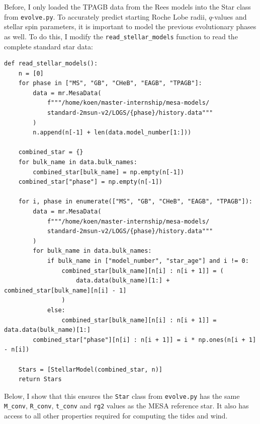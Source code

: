 \documentclass[a4paper,10pt]{article}
\begin{document}
Before, I only loaded the TPAGB data from the Rees models into the Star class from \lstinline[style=output, breaklines=true]|evolve.py|. To accurately predict starting Roche Lobe radii, \(q\)-values and stellar spin parameters, it is important to model the previous evolutionary phases as well. To do this, I modify the \lstinline[style=output, breaklines=true]|read_stellar_models| function to read the complete standard star data:
\begin{verbatim}
def read_stellar_models():
    n = [0]
    for phase in ["MS", "GB", "CHeB", "EAGB", "TPAGB"]:
        data = mr.MesaData(
            f"""/home/koen/master-internship/mesa-models/
            standard-2msun-v2/LOGS/{phase}/history.data"""
        )
        n.append(n[-1] + len(data.model_number[1:]))

    combined_star = {}
    for bulk_name in data.bulk_names:
        combined_star[bulk_name] = np.empty(n[-1])
    combined_star["phase"] = np.empty(n[-1])

    for i, phase in enumerate(["MS", "GB", "CHeB", "EAGB", "TPAGB"]):
        data = mr.MesaData(
            f"""/home/koen/master-internship/mesa-models/
            standard-2msun-v2/LOGS/{phase}/history.data"""
        )
        for bulk_name in data.bulk_names:
            if bulk_name in ["model_number", "star_age"] and i != 0:
                combined_star[bulk_name][n[i] : n[i + 1]] = (
                    data.data(bulk_name)[1:] + combined_star[bulk_name][n[i] - 1]
                )
            else:
                combined_star[bulk_name][n[i] : n[i + 1]] = data.data(bulk_name)[1:]
        combined_star["phase"][n[i] : n[i + 1]] = i * np.ones(n[i + 1] - n[i])

    Stars = [StellarModel(combined_star, n)]
    return Stars
\end{verbatim}

Below, I show that this ensures the \lstinline[style=output, breaklines=true]|Star| class from \lstinline[style=output, breaklines=true]|evolve.py| has the same \lstinline[style=output, breaklines=true]|M_conv|, \lstinline[style=output, breaklines=true]|R_conv|, \lstinline[style=output, breaklines=true]|t_conv| and \lstinline[style=output, breaklines=true]|rg2| values as the MESA reference star. It also has access to all other properties required for computing the tides and wind.

\begin{figure}[ht]
    \centering
\end{figure}
\end{document}
